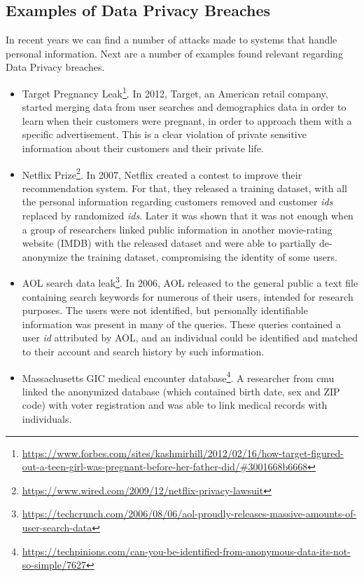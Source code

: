 \subsection{Examples of Data Privacy Breaches}
\label{ssec:ExamplesDataPrivacyBreaches}


In recent years we can find a number of attacks made to systems that handle personal information. Next are a number of examples found relevant regarding Data Privacy breaches.

\begin{itemize}
	
    \item Target Pregnancy Leak\footnote{\url{https://www.forbes.com/sites/kashmirhill/2012/02/16/how-target-figured-out-a-teen-girl-was-pregnant-before-her-father-did/\#3001668b6668}}. In 2012, Target, an American retail company, started merging data from user searches and demographics data in order to learn when their customers were pregnant, in order to approach them with a specific advertisement. This is a clear violation of private sensitive information about their customers and their private life.


    \item Netflix Prize\footnote{\url{https://www.wired.com/2009/12/netflix-privacy-lawsuit}}. In 2007, Netflix created a contest to improve their recommendation system. For that, they released a training dataset, with all the personal information regarding customers removed and customer \textit{ids} replaced by randomized \textit{ids}. Later it was shown that it was not enough when a group of researchers linked public information in another movie-rating website (IMDB) with the released dataset and were able to partially de-anonymize the training dataset, compromising the identity of some users.

    \item AOL search data leak\footnote{\url{https://techcrunch.com/2006/08/06/aol-proudly-releases-massive-amounts-of-user-search-data}}. In 2006, AOL released to the general public a text file containing search keywords for numerous of their users, intended for research purposes. The users were not identified, but personally identifiable information was present in many of the queries. These queries contained a user \textit{id} attributed by AOL, and an individual could be identified and matched to their account and search history by such information.



   \item Massachusetts GIC medical encounter database\footnote{\url{https://techpinions.com/can-you-be-identified-from-anonymous-data-its-not-so-simple/7627}}. A researcher from \ac{cmu} linked the anonymized database (which contained birth date, sex and ZIP code) with voter registration and was able to link medical records with individuals.


\end{itemize}